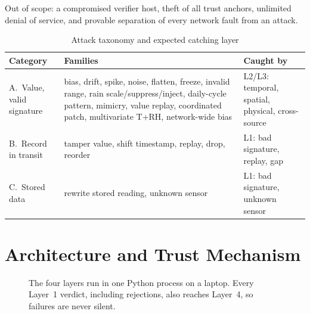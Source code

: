 \documentclass[conference]{IEEEtran}
\begin{document}
Out of scope: a compromised verifier host, theft of all trust anchors, unlimited denial of service, and
provable separation of every network fault from an attack.

\begin{table}[t]
\caption{Attack taxonomy and expected catching layer}
\label{tab:taxonomy}
\centering
\small
\begin{tabular}{@{}>{\raggedright}p{}>{\raggedright}p{}>{\raggedright\arraybackslash}p{}@{}}
\toprule
Category & Families & Caught by \\
\midrule
A.~Value, valid signature & bias, drift, spike, noise, flatten, freeze, invalid range, rain scale/suppress/inject,
daily-cycle pattern, mimicry, value replay, coordinated patch, multivariate T+RH, network-wide bias &
L2/L3: temporal, spatial, physical, cross-source \\
B.~Record in transit & tamper value, shift timestamp, replay, drop, reorder & L1: bad signature, replay, gap \\
C.~Stored data & rewrite stored reading, unknown sensor & L1: bad signature, unknown sensor \\
\bottomrule
\end{tabular}
\end{table}

\section{Architecture and Trust Mechanism}

\begin{figure}[t]
\centering
{}
\caption{The four layers run in one Python process on a laptop. Every Layer~1 verdict, including rejections,
also reaches Layer~4, so failures are never silent.}
\label{fig:arch}
\end{figure}
\end{document}
